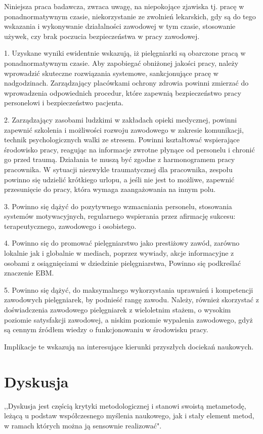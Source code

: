 \documentclass[a4paper,12pt,twoside,openright]{mwrep}
\begin{document}
Niniejsza praca badawcza, zwraca uwagę, na niepokojące zjawiska tj. pracę w ponadnormatywnym czasie, niekorzystanie ze zwolnień lekarskich, gdy są do tego wskazania i wykonywanie działalności zawodowej w tym czasie, stosowanie używek, czy brak poczucia bezpieczeństwa w pracy zawodowej.

1.	 Uzyskane wyniki ewidentnie wskazują, iż pielęgniarki są obarczone pracą w ponadnormatywnym czasie. Aby zapobiegać obniżonej jakości pracy, należy wprowadzić skuteczne rozwiązania systemowe, sankcjonujące pracę w nadgodzinach. Zarządzający placówkami ochrony zdrowia powinni zmierzać do wprowadzenia odpowiednich procedur, które zapewnią bezpieczeństwo pracy personelowi i bezpieczeństwo pacjenta.

2.	Zarządzający zasobami ludzkimi w zakładach opieki medycznej, powinni zapewnić szkolenia i możliwości rozwoju zawodowego w zakresie komunikacji, technik psychologicznych walki ze stresem. Powinni kształtować wspierające środowisko pracy, reagując na informacje zwrotne płynące od personelu i chronić go przed traumą. Działania te muszą być zgodne z harmonogramem pracy pracownika. W sytuacji niezwykle traumatycznej dla pracownika, zespołu powinno się udzielić krótkiego urlopu, a jeśli nie jest to możliwe, zapewnić przesunięcie do pracy, która wymaga zaangażowania na innym polu.

3.	Powinno się dążyć do pozytywnego wzmacniania personelu, stosowania systemów motywacyjnych, regularnego wspierania przez afirmację sukcesu: terapeutycznego, zawodowego i osobistego.

4.	Powinno się do promować pielęgniarstwo jako prestiżowy zawód, zarówno lokalnie jak i globalnie w mediach, poprzez wywiady, akcje informacyjne z osobami z osiągnięciami w dziedzinie pielęgniarstwa, Powinno się podkreślać znaczenie EBM.

5.	Powinno się dążyć, do maksymalnego wykorzystania uprawnień i kompetencji zawodowych pielęgniarek, by podnieść rangę zawodu. Należy, również skorzystać z doświadczenia zawodowego pielęgniarek z wieloletnim stażem, o wysokim poziomie satysfakcji zawodowej, a niskim poziomie wypalenia zawodowego, gdyż są cennym źródłem wiedzy o funkcjonowaniu w środowisku pracy.


Implikacje te wskazują na interesujące kierunki przyszłych dociekań naukowych.


\section*{Dyskusja}
,,Dyskusja jest częścią krytyki metodologicznej i stanowi swoistą metametodę, leżącą u podstaw współczesnego myślenia naukowego, jak i stały element metod, w ramach których można ją sensownie realizować"\cite{krytyka}.
\end{document}
